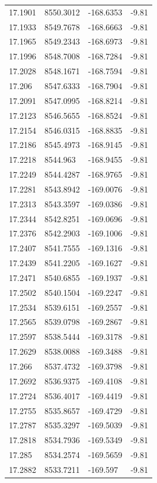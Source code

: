 \begin{table}[H]
\begin{tabular}{llll}
17.1901 & 8550.3012 & -168.6353 & -9.81 \\
17.1933 & 8549.7678 & -168.6663 & -9.81 \\
17.1965 & 8549.2343 & -168.6973 & -9.81 \\
17.1996 & 8548.7008 & -168.7284 & -9.81 \\
17.2028 & 8548.1671 & -168.7594 & -9.81 \\
17.206 & 8547.6333 & -168.7904 & -9.81 \\
17.2091 & 8547.0995 & -168.8214 & -9.81 \\
17.2123 & 8546.5655 & -168.8524 & -9.81 \\
17.2154 & 8546.0315 & -168.8835 & -9.81 \\
17.2186 & 8545.4973 & -168.9145 & -9.81 \\
17.2218 & 8544.963 & -168.9455 & -9.81 \\
17.2249 & 8544.4287 & -168.9765 & -9.81 \\
17.2281 & 8543.8942 & -169.0076 & -9.81 \\
17.2313 & 8543.3597 & -169.0386 & -9.81 \\
17.2344 & 8542.8251 & -169.0696 & -9.81 \\
17.2376 & 8542.2903 & -169.1006 & -9.81 \\
17.2407 & 8541.7555 & -169.1316 & -9.81 \\
17.2439 & 8541.2205 & -169.1627 & -9.81 \\
17.2471 & 8540.6855 & -169.1937 & -9.81 \\
17.2502 & 8540.1504 & -169.2247 & -9.81 \\
17.2534 & 8539.6151 & -169.2557 & -9.81 \\
17.2565 & 8539.0798 & -169.2867 & -9.81 \\
17.2597 & 8538.5444 & -169.3178 & -9.81 \\
17.2629 & 8538.0088 & -169.3488 & -9.81 \\
17.266 & 8537.4732 & -169.3798 & -9.81 \\
17.2692 & 8536.9375 & -169.4108 & -9.81 \\
17.2724 & 8536.4017 & -169.4419 & -9.81 \\
17.2755 & 8535.8657 & -169.4729 & -9.81 \\
17.2787 & 8535.3297 & -169.5039 & -9.81 \\
17.2818 & 8534.7936 & -169.5349 & -9.81 \\
17.285 & 8534.2574 & -169.5659 & -9.81 \\
17.2882 & 8533.7211 & -169.597 & -9.81 \\

\end{tabular}
\end{table}
